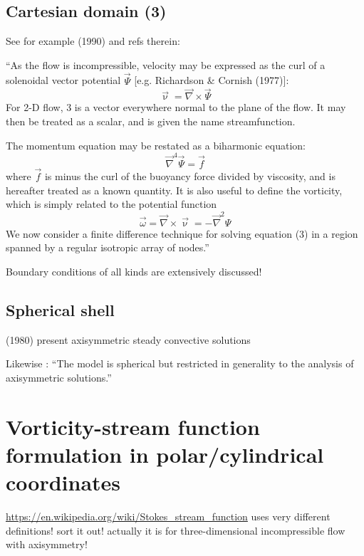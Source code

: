 \subsection{Cartesian domain (3)}

See for example \textcite{hous90} (1990) and refs therein:
\begin{displayquote}
{\color{darkgray}
``As the flow is incompressible, velocity may
be expressed as the curl of a solenoidal vector potential $\vec\Psi$
[e.g. Richardson \& Cornish (1977)]:
\[
\vec \upnu = \vec\nabla \times \vec\Psi
\]
For 2-D flow, 3 is a vector everywhere normal to the plane
of the flow. It may then be treated as a scalar, and is given
the name streamfunction.

The momentum equation may be restated as a biharmonic equation:
\[
\vec\nabla^4 \vec\Psi = \vec{f}
\]
where $\vec{f}$ is minus the curl of the buoyancy force divided by
viscosity, and is hereafter treated as a known quantity. It is
also useful to define the vorticity, which is simply related to
the potential function
\[
\vec\omega = \vec\nabla \times \vec\upnu = -\vec\nabla^2 \Psi
\]
We now consider a finite difference technique for solving
equation (3) in a region spanned by a regular isotropic array
of nodes.'' }
\end{displayquote}

Boundary conditions of all kinds are extensively discussed!


\subsection{Spherical shell}

\textcite{zess80} (1980) present axisymmetric steady convective solutions

Likewise \textcite{sope90,sope94}: ``The model is
spherical but restricted in generality to the analysis of axisymmetric solutions.''



\section{Vorticity-stream function formulation in polar/cylindrical coordinates}

\url{https://en.wikipedia.org/wiki/Stokes_stream_function} uses very different 
definitions! {\color{orange} sort it out!} 
actually it is for three-dimensional incompressible flow with axisymmetry!

